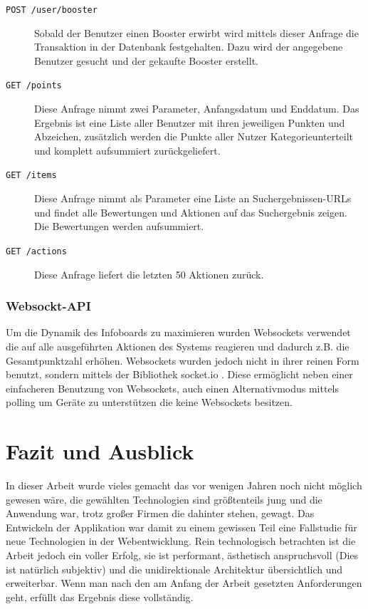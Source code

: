 \documentclass[12pt,twoside]{book}
\begin{document}
\begin{description}
	\item[\texttt{POST /user/booster}] Sobald der Benutzer einen Booster erwirbt wird mittels dieser Anfrage die Transaktion in der Datenbank festgehalten. Dazu wird der angegebene Benutzer gesucht und der gekaufte Booster erstellt.
	\item[\texttt{GET /points}] Diese Anfrage nimmt zwei Parameter, Anfangsdatum und Enddatum. Das Ergebnis ist eine Liste aller Benutzer mit ihren jeweiligen Punkten und Abzeichen, zusätzlich werden die Punkte aller Nutzer Kategorieunterteilt und komplett aufsummiert zurückgeliefert.
	\item[\texttt{GET /items}] Diese Anfrage nimmt als Parameter eine Liste an Suchergebnissen-URLs und findet alle Bewertungen und Aktionen auf das Suchergebnis zeigen. Die Bewertungen werden aufsummiert.
	\item[\texttt{GET /actions}] Diese Anfrage liefert die letzten 50 Aktionen zurück.
	
\end{description}

\subsection{Websockt-API}

Um die Dynamik des Infoboards zu maximieren wurden Websockets verwendet die auf alle ausgeführten Aktionen des Systems reagieren und dadurch z.B. die Gesamtpunktzahl erhöhen. Websockets wurden jedoch nicht in ihrer reinen Form benutzt, sondern mittels der Bibliothek socket.io \cite{rauch2013socket}. Diese ermöglicht neben einer einfacheren Benutzung von Websockets, 
auch einen Alternativmodus mittels polling um Geräte zu unterstützen die keine Websockets besitzen.


\chapter{Fazit und Ausblick}

In dieser Arbeit wurde vieles gemacht das vor wenigen Jahren noch nicht möglich gewesen wäre, die gewählten Technologien sind größtenteils jung und die Anwendung war, trotz großer Firmen die dahinter stehen, gewagt. Das Entwickeln der Applikation war damit zu einem gewissen Teil eine Fallstudie für neue Technologien in der Webentwicklung.
Rein technologisch betrachten ist die Arbeit jedoch ein voller Erfolg, sie ist performant, ästhetisch anspruchsvoll (Dies ist natürlich subjektiv) und die unidirektionale Architektur übersichtlich und erweiterbar.
Wenn man nach den am Anfang der Arbeit gesetzten Anforderungen geht, erfüllt das Ergebnis diese vollständig.
\end{document}
